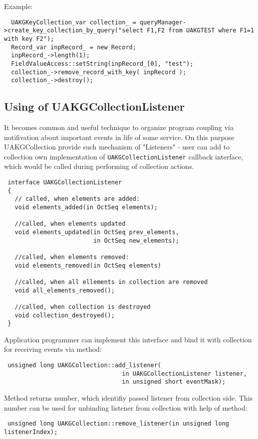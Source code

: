 Example:

\begin{verbatim}
  UAKGKeyCollection_var collection_ = queryManager->create_key_collection_by_query("select F1,F2 from UAKGTEST where F1=1 with key F2");
  Record_var inpRecord_ = new Record;
  inpRecord_->length(1);
  FieldValueAccess::setString(inpRecord_[0], "test");
  collection_->remove_record_with_key( inpRecord );
  collection_->destroy();
\end{verbatim}

\subsection{ Using of UAKGCollectionListener }

 It becomes common and useful technique to organize program coupling via 
 notifivation about important events in life of some service.
 On this purpose UAKGCollection provide
 such mechanism of "Listeners" - user can add to collection own implementation
 of \verb|UAKGCollectionListener| callback interface, which would be called
 during performing of collection actions. 

\begin{verbatim}
 interface UAKGCollectionListener
 {
   // called, when elements are added:
   void elements_added(in OctSeq elements);

   //called, when elements updated
   void elements_updated(in OctSeq prev_elements,
                         in OctSeq new_elements); 

   //called, when elements removed:
   void elements_removed(in OctSeq elements)

   //called, when all ellements in collection are removed
   void all_elements_removed();

   //called, when collection is destroyed
   void collection_destroyed();
 }
\end{verbatim}

 Application programmer can implement this interface and bind it with
 collection for receiving events via method:
\begin{verbatim}
 unsigned long UAKGCollection::add_listener(
                                 in UAKGCollectionListener listener,
                                 in unsigned short eventMask);
\end{verbatim}
 Method returns number, which identifiy passed listener from
collection side. This number can be used for unbinding listener from
collection with help of method:
\begin{verbatim}
 unsigned long UAKGCollection::remove_listener(in unsigned long listenerIndex);
\end{verbatim}

